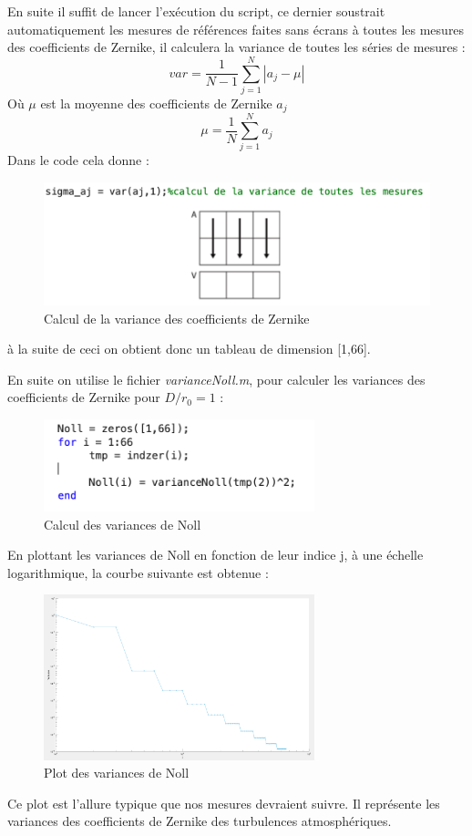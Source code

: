 En suite il suffit de lancer l'exécution du script, ce dernier soustrait automatiquement les mesures de références
faites sans écrans à toutes les mesures des coefficients de Zernike, il calculera la variance de toutes les séries de mesures :
\begin{equation}
  var = \frac{1}{N-1}\sum_{j=1}^{N}|a_j - \mu|
\end{equation}
Où $\mu$ est la moyenne des coefficients de Zernike $a_j$
\begin{equation}
  \mu = \frac{1}{N}\sum_{j=1}^{N}a_j
\end{equation}
Dans le code cela donne :
\begin{figure}[H]
  \centering
  \includegraphics[width = 1\textwidth]{assets/figures/mesures/variance_matlab.png}
  \caption{Calcul de la variance des coefficients de Zernike}
\end{figure}
à la suite de ceci on obtient donc un tableau de dimension [1,66].

\newpage
En suite on utilise le fichier \textit{varianceNoll.m}, pour calculer les variances des coefficients de Zernike
pour $D/r_0 = 1$ :
\begin{figure}[H]
  \centering
  \includegraphics[width = 0.7\textwidth]{assets/figures/mesures/Calcul_variance_nool.png}
  \caption{Calcul des variances de Noll}
\end{figure}
En plottant les variances de Noll en fonction de leur indice j, à une échelle logarithmique, la courbe suivante est obtenue :
\begin{figure}[H]
  \centering
  \includegraphics[width = 0.7\textwidth]{assets/figures/mesures/plot_variance_Noll.png}
  \caption{Plot des variances de Noll}
\end{figure}
Ce plot est l'allure typique que nos mesures devraient suivre. Il représente les variances des coefficients de Zernike
des turbulences atmosphériques.


